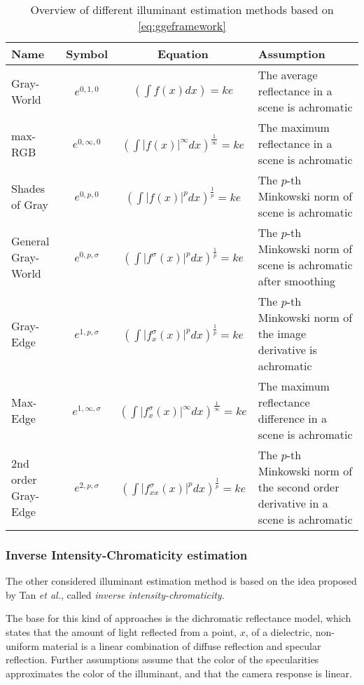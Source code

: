 \begin{table}[h!]
\caption{Overview of different illuminant estimation methods based on \ref{eq:ggeframework}}
\centering
\small
\begin{tabular}{l c c p{4.5cm}} 
\hline\hline 
Name & Symbol & Equation & Assumption \\ [0.5ex]
\hline 
Gray-World & $e^{0, 1, 0}$ & $(\int f(x) dx) = k e$ & The average reflectance in a scene is achromatic \\
max-RGB & $e^{0, \infty, 0}$ & $(\int |f(x)|^{\infty} dx)^{\frac{1}{\infty}} = k e$ & The maximum reflectance in a scene is achromatic \\
Shades of Gray & $e^{0, p, 0}$ & $(\int |f(x)|^{p} dx)^{\frac{1}{p}} = k e$ & The $p$-th Minkowski norm of scene is achromatic \\
General Gray-World & $e^{0, p, \sigma}$ & $(\int |f^{\sigma}(x)|^{p} dx)^{\frac{1}{p}} = k e$ & The $p$-th Minkowski norm of scene is achromatic after smoothing\\
Gray-Edge & $e^{1, p, \sigma}$ & $(\int |f^{\sigma}_{x}(x)|^{p} dx)^{\frac{1}{p}} = k e$ & The $p$-th Minkowski norm of the image derivative is achromatic\\
Max-Edge & $e^{1, \infty, \sigma}$ & $(\int |f^{\sigma}_{x}(x)|^{\infty} dx)^{\frac{1}{\infty}} = k e$ & The maximum reflectance difference in a scene is achromatic\\
2nd order Gray-Edge & $e^{2, p, \sigma}$ & $(\int |f^{\sigma}_{xx}(x)|^{p} dx)^{\frac{1}{p}} = k e$ & The $p$-th Minkowski norm of the second order derivative in a scene is achromatic\\ [1ex]
\hline
\end{tabular}
\label{table:ggemethods}
\end{table}

\subsubsection{Inverse Intensity-Chromaticity estimation}

The other considered illuminant estimation method is based on the idea proposed by Tan \emph{et al.}\cite{tan2004color}, called \emph{inverse intensity-chromaticity}.

The base for this kind of approaches is the dichromatic reflectance model\cite{gholap2008illuminant}, which states that the amount of light reflected from a point, $x$, of a dielectric, non-uniform material is a linear combination of diffuse reflection and specular reflection. Further assumptions assume that the color of the specularities approximates the color of the illuminant, and that the camera response is linear.

